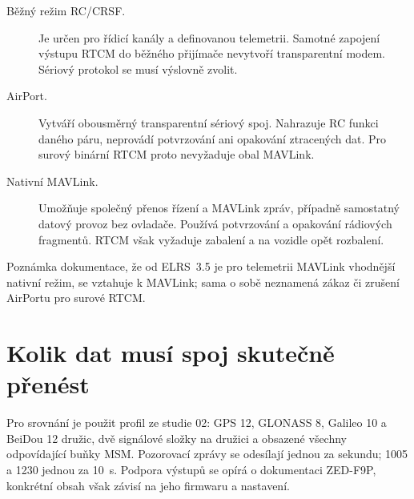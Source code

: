 \documentclass[11pt,a4paper]{article}
\begin{document}
\begin{description}
\item[Běžný režim RC/CRSF.] Je určen pro řídicí kanály a definovanou telemetrii. Samotné zapojení výstupu RTCM do běžného přijímače nevytvoří transparentní modem. Sériový protokol se musí výslovně zvolit.\cite{serial}
\item[AirPort.] Vytváří obousměrný transparentní sériový spoj. Nahrazuje RC funkci daného páru, neprovádí potvrzování ani opakování ztracených dat. Pro surový binární RTCM proto nevyžaduje obal MAVLink.\cite{airport}
\item[Nativní MAVLink.] Umožňuje společný přenos řízení a MAVLink zpráv, případně samostatný datový provoz bez ovladače. Používá potvrzování a opakování rádiových fragmentů. RTCM však vyžaduje zabalení a na vozidle opět rozbalení.\cite{mavlink}
\end{description}
Poznámka dokumentace, že od ELRS~3.5 je pro telemetrii MAVLink vhodnější nativní režim, se vztahuje k MAVLink; sama o sobě neznamená zákaz či zrušení AirPortu pro surové RTCM.\cite{airport}

\section{Kolik dat musí spoj skutečně přenést}
Pro srovnání je použit profil ze studie 02: GPS 12, GLONASS 8, Galileo 10 a BeiDou 12 družic, dvě signálové složky na družici a obsazené všechny odpovídající buňky MSM. Pozorovací zprávy se odesílají jednou za sekundu; 1005 a 1230 jednou za 10~s. Podpora výstupů se opírá o dokumentaci ZED-F9P, konkrétní obsah však závisí na jeho firmwaru a nastavení.\cite{f9p}
\end{document}
